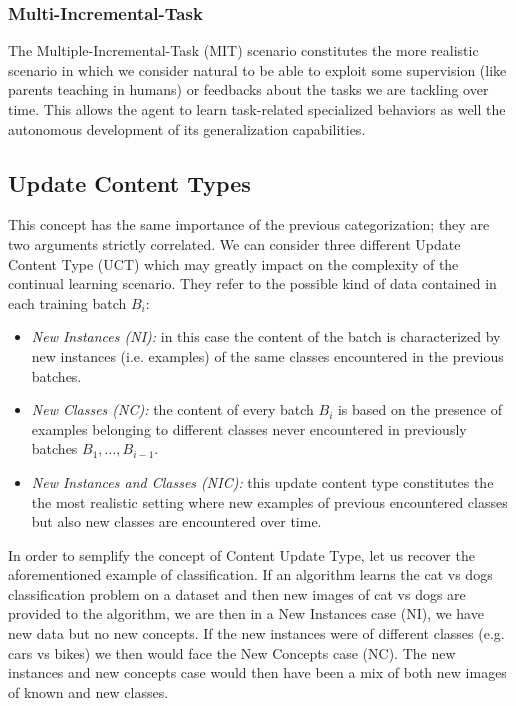 \documentclass[english, LaM, oneside]{sapthesis}%
\begin{document}
   \subsubsection{Multi-Incremental-Task}
   The Multiple-Incremental-Task (MIT) scenario constitutes the more realistic scenario in which we consider natural to be able to exploit some supervision (like parents teaching in humans) or feedbacks about the tasks we are tackling over time. This allows the agent to learn task-related specialized behaviors as well the autonomous development of its generalization capabilities.
\subsection{Update Content Types}
\label{chap-332}
This concept has the same importance of the previous categorization; they are two arguments strictly correlated.
We can consider three different Update Content Type (UCT) which may greatly impact on the complexity of the continual learning scenario. They refer to the possible kind of data contained in each training batch $B_i$:
\begin{itemize}
    \item \textit{New Instances (NI):} in this case the content of the batch is characterized by new instances (i.e. examples) of the same classes encountered in the previous batches.
    \item \textit{New Classes (NC):} the content of every batch $B_i$ is based on the presence of examples belonging to different classes never encountered in previously batches $B_1,...,B_{i−1}.$
    \item \textit{New Instances and Classes (NIC):} this update content type constitutes the the most realistic setting where new examples of previous encountered classes but also new classes are encountered over time.
\end{itemize}

In order to semplify the concept of Content Update Type, let us recover the aforementioned example of classification. If an algorithm learns the cat vs dogs classification problem on a dataset and then new images of cat vs dogs are provided to the algorithm, we are then in a New Instances case (NI), we have new data but no new concepts. If the new instances were of different classes (e.g. cars vs bikes) we then would face the New Concepts case (NC). The new instances and new concepts case would then have been a mix of both new images of known and new classes.
\end{document}
